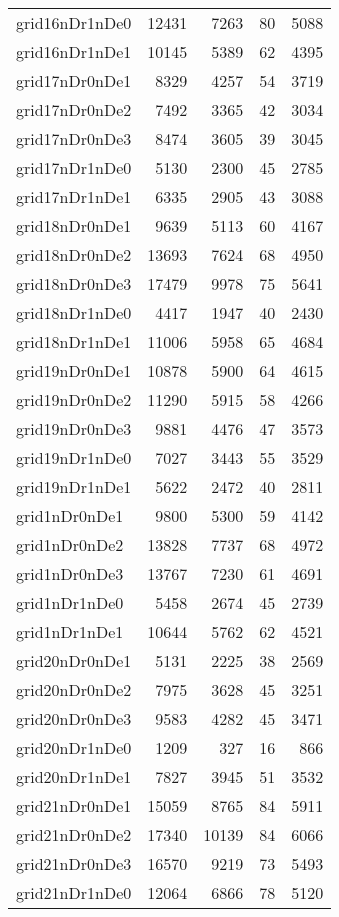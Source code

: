 \documentclass[../../../thesis.tex]{subfiles}
\begin{document}
\begin{longtable}{lrrrr}
grid16nDr1nDe0 & 12431 & 7263 & 80 & 5088 \\
grid16nDr1nDe1 & 10145 & 5389 & 62 & 4395 \\
grid17nDr0nDe1 & 8329 & 4257 & 54 & 3719 \\
grid17nDr0nDe2 & 7492 & 3365 & 42 & 3034 \\
grid17nDr0nDe3 & 8474 & 3605 & 39 & 3045 \\
grid17nDr1nDe0 & 5130 & 2300 & 45 & 2785 \\
grid17nDr1nDe1 & 6335 & 2905 & 43 & 3088 \\
grid18nDr0nDe1 & 9639 & 5113 & 60 & 4167 \\
grid18nDr0nDe2 & 13693 & 7624 & 68 & 4950 \\
grid18nDr0nDe3 & 17479 & 9978 & 75 & 5641 \\
grid18nDr1nDe0 & 4417 & 1947 & 40 & 2430 \\
grid18nDr1nDe1 & 11006 & 5958 & 65 & 4684 \\
grid19nDr0nDe1 & 10878 & 5900 & 64 & 4615 \\
grid19nDr0nDe2 & 11290 & 5915 & 58 & 4266 \\
grid19nDr0nDe3 & 9881 & 4476 & 47 & 3573 \\
grid19nDr1nDe0 & 7027 & 3443 & 55 & 3529 \\
grid19nDr1nDe1 & 5622 & 2472 & 40 & 2811 \\
grid1nDr0nDe1 & 9800 & 5300 & 59 & 4142 \\
grid1nDr0nDe2 & 13828 & 7737 & 68 & 4972 \\
grid1nDr0nDe3 & 13767 & 7230 & 61 & 4691 \\
grid1nDr1nDe0 & 5458 & 2674 & 45 & 2739 \\
grid1nDr1nDe1 & 10644 & 5762 & 62 & 4521 \\
grid20nDr0nDe1 & 5131 & 2225 & 38 & 2569 \\
grid20nDr0nDe2 & 7975 & 3628 & 45 & 3251 \\
grid20nDr0nDe3 & 9583 & 4282 & 45 & 3471 \\
grid20nDr1nDe0 & 1209 & 327 & 16 & 866 \\
grid20nDr1nDe1 & 7827 & 3945 & 51 & 3532 \\
grid21nDr0nDe1 & 15059 & 8765 & 84 & 5911 \\
grid21nDr0nDe2 & 17340 & 10139 & 84 & 6066 \\
grid21nDr0nDe3 & 16570 & 9219 & 73 & 5493 \\
grid21nDr1nDe0 & 12064 & 6866 & 78 & 5120 \\

\end{longtable}
\end{document}
